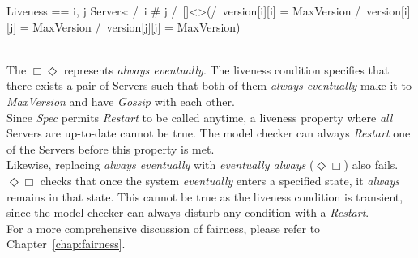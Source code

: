 \begin{tla}
Liveness == 
    \E i, j \in Servers: 
        /\ i # j
        /\ []<>(/\ version[i][i] = MaxVersion
                /\ version[i][j] = MaxVersion
                /\ version[j][j] = MaxVersion)
\end{tla}
\begin{tlatex}
%
%
%
%
%
\end{tlatex}
\\

The $\Box\Diamond$ represents \textit{always eventually}. The liveness condition
specifies that there exists a pair of Servers such that both of them
\textit{always eventually} make it to \textit{MaxVersion} and have
\textit{Gossip} with each other.\\

Since \textit{Spec} permits \textit{Restart} to be called anytime, a liveness
property where \textit{all} Servers are up-to-date cannot be true. The model
checker can always \textit{Restart} one of the Servers before this property is
met.\\

Likewise, replacing \textit{always eventually} with \textit{eventually always}
($\Diamond\Box$) also fails. $\Diamond\Box$ checks that once the system
\textit{eventually} enters a specified state, it \textit{always} remains in that
state. This cannot be true as the liveness condition is transient, since the
model checker can always disturb any condition with a \textit{Restart}.\\

For a more comprehensive discussion of fairness, please refer to
Chapter~\ref{chap:fairness}.

% 

